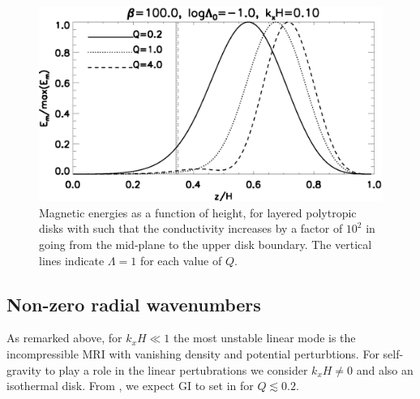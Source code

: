 \begin{figure}
  \includegraphics[width=\linewidth]{figures/compare_results_poly_layer_amp100}
  \caption{Magnetic energies as a function of height, for layered polytropic disks with
    such that the conductivity increases by a 
    factor of $10^2$ in going from the mid-plane to the upper disk
    boundary. The vertical lines indicate $\Lambda=1$ for each value
    of $Q$.
    \label{poly_layer}}
\end{figure}




\subsection{Non-zero radial wavenumbers}  
As remarked above, for $k_xH\ll 1$ the most unstable linear mode is
the incompressible MRI with vanishing density and potential 
perturbtions. For self-gravity to play a role in the linear
pertubrations we consider $k_xH \neq 0$ and also an isothermal
disk. From \cite{mamat10}, we expect GI to set in
for $Q\lesssim 0.2$. 
 
